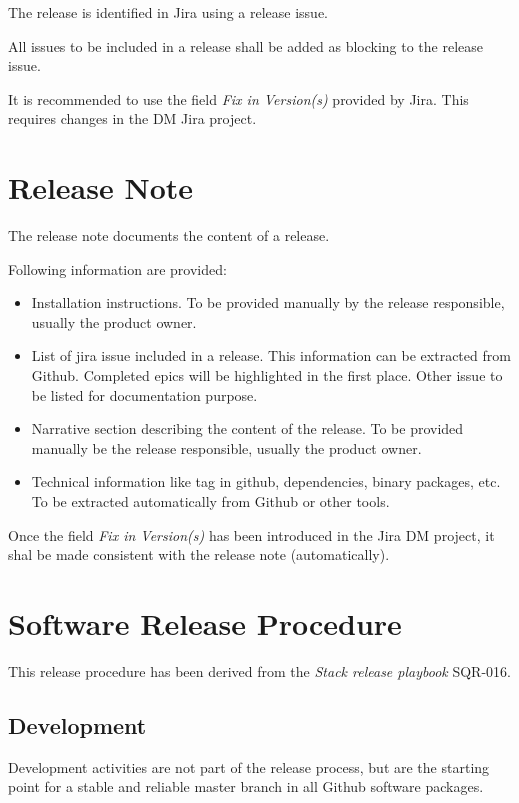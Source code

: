 The release is identified in Jira using a release issue.

All issues to be included in a release shall be added as blocking to the release issue.

It is recommended to use the field \textit{Fix in Version(s)} provided by Jira.
This requires changes in the DM Jira project.


\newpage
\section{Release Note} \label{sect:relnote}

The release note documents the content of a release.

Following information are provided:
\begin{itemize}
\item Installation instructions. To be provided manually by the release responsible, usually the product owner.
\item List of jira issue included in a release. This information can be extracted from Github. Completed epics will be highlighted in the first place. Other issue to be listed for documentation purpose. 
\item Narrative section describing the content of the release. To be provided manually be the release responsible, usually the product owner.
\item Technical information like tag in github, dependencies, binary packages, etc. To be extracted automatically from Github or other tools.
\end{itemize}

Once the field \textit{Fix in Version(s)} has been introduced in the Jira DM project, it shal be made consistent with the release note (automatically).


\newpage
\section{Software Release Procedure} \label{sect:releaseprocedure}

This release procedure has been derived from the \textit{Stack release playbook} SQR-016.

\subsection{Development} \label{sect:dev}

Development activities are not part of the release process, but are the starting point for a stable and reliable master branch in all Github software packages.

